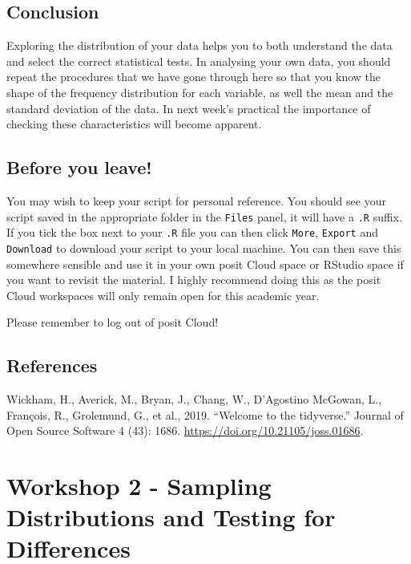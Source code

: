 \documentclass[
]{book}
\begin{document}
\hypertarget{conclusion}{%
\section{Conclusion}\label{conclusion}}

Exploring the distribution of your data helps you to both understand the data and select the correct statistical tests. In analysing your own data, you should repeat the procedures that we have gone through here so that you know the shape of the frequency distribution for each variable, as well the mean and the standard deviation of the data. In next week's practical the importance of checking these characteristics will become apparent.

\hypertarget{before-you-leave-2}{%
\section{Before you leave!}\label{before-you-leave-2}}

You may wish to keep your script for personal reference. You should see your script saved in the appropriate folder in the \texttt{Files} panel, it will have a \texttt{.R} suffix. If you tick the box next to your \texttt{.R} file you can then click \texttt{More}, \texttt{Export} and \texttt{Download} to download your script to your local machine. You can then save this somewhere sensible and use it in your own posit Cloud space or RStudio space if you want to revisit the material. I highly recommend doing this as the posit Cloud workspaces will only remain open for this academic year.

Please remember to log out of posit Cloud!

\hypertarget{references-1}{%
\section{References}\label{references-1}}

Wickham, H., Averick, M., Bryan, J., Chang, W., D'Agostino McGowan, L., François, R., Grolemund, G., et al., 2019. ``Welcome to the tidyverse.'' Journal of Open Source Software 4 (43): 1686. \url{https://doi.org/10.21105/joss.01686}.

\hypertarget{workshop-2---sampling-distributions-and-testing-for-differences}{%
\chapter{Workshop 2 - Sampling Distributions and Testing for Differences}\label{workshop-2---sampling-distributions-and-testing-for-differences}}
\end{document}

